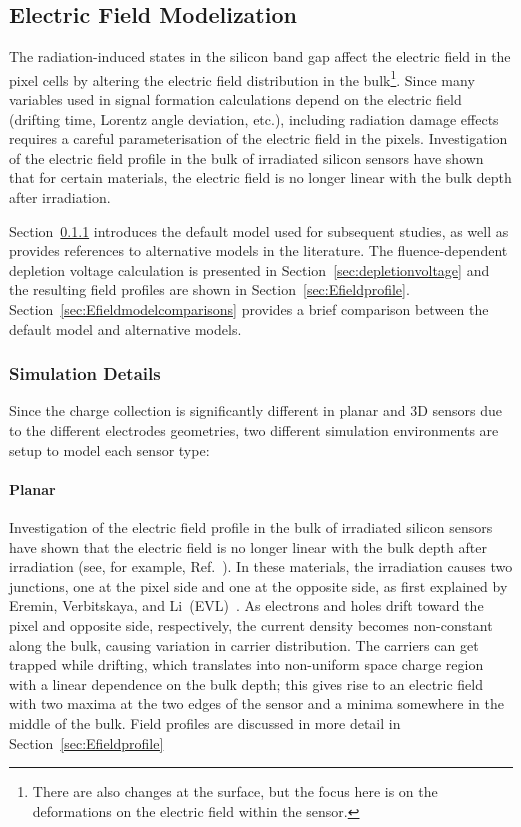 \subsection{Electric Field Modelization}
The radiation-induced states in the silicon band gap affect the electric field in the pixel cells by altering 
the electric field distribution in the bulk\footnote{There are also changes at the surface, but the focus 
here is on the deformations on the electric field within the sensor.}. Since many variables used in signal 
formation calculations depend on the electric field (drifting time, Lorentz angle deviation, etc.), including 
radiation damage effects requires a careful parameterisation of the electric field in the pixels. 
Investigation of the electric field profile in the bulk of irradiated silicon sensors have shown that for 
certain materials, the electric field is no longer linear with the bulk depth after irradiation.  

Section~\ref{sec:ElectricField:SimulationDetails} introduces the default model used for subsequent studies, as well as provides references to alternative models in the literature.   The fluence-dependent depletion voltage calculation is presented in Section~\ref{sec:depletionvoltage} and the resulting field profiles are shown in Section~\ref{sec:Efieldprofile}.  Section~\ref{sec:Efieldmodelcomparisons} provides a brief comparison between the default model and alternative models.

\subsubsection{Simulation Details}
\label{sec:ElectricField:SimulationDetails}

Since the charge collection is significantly different in planar and 3D sensors due to the different electrodes geometries, two different simulation environments are setup to model each sensor type:

\paragraph{Planar}

Investigation of the electric field profile in the bulk of irradiated silicon sensors have shown that the electric field is no longer linear with the bulk depth after irradiation (see, for example, Ref.~\cite{bib:DP,CHIOCHIA2006}). In these materials, the irradiation causes two junctions, one at the pixel side and one at the opposite side, as first explained by Eremin, Verbitskaya, and Li~(EVL)~\cite{bib:DP}. As electrons and holes drift toward the pixel and opposite side, respectively, the current density becomes non-constant along the bulk, causing variation in carrier distribution. The carriers can get trapped while drifting, which translates into non-uniform space charge region with a linear dependence on the bulk depth; this gives rise to an electric field with two maxima at the two edges of the sensor and a minima somewhere in the middle of the bulk.  Field profiles are discussed in more detail in Section~\ref{sec:Efieldprofile}

